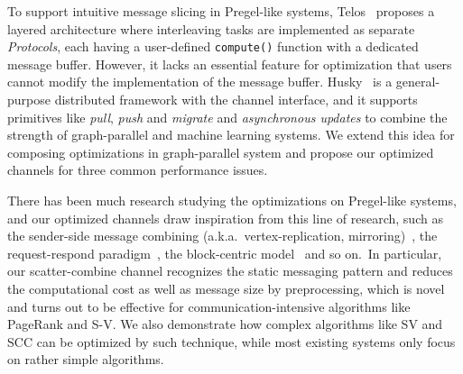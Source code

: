 \documentclass{sokendai_thesis} %
\begin{document}
To support intuitive message slicing in Pregel-like systems, Telos~\cite{telos} proposes a layered architecture where interleaving tasks are implemented as separate \emph{Protocols}, each having a user-defined \texttt{compute()} function with a dedicated message buffer.
However, it lacks an essential feature for optimization that users cannot modify the implementation of the message buffer.
Husky~\cite{husky} is a general-purpose distributed framework with the channel interface, and it supports primitives like \textit{pull}, \textit{push} and \textit{migrate} and \textit{asynchronous updates} to combine the strength of graph-parallel and machine learning systems.
We extend this idea for composing optimizations in graph-parallel system and propose our optimized channels for three common performance issues.

There has been much research studying the optimizations on Pregel-like systems, and our optimized channels draw inspiration from this line of research, such as the sender-side message combining (a.k.a.~vertex-replication, mirroring)~\cite{xpregel,gps,distrgraphlab,yan2015effective}, the request-respond paradigm~\cite{yan2015effective}, the block-centric model~\cite{thinkgraph,yan2014blogel,goffish} and so on.\
In particular, our scatter-combine channel recognizes the static messaging pattern and reduces the computational cost as well as message size by preprocessing, which is novel and turns out to be effective for com\-mu\-ni\-ca\-tion-intensive algorithms like PageRank and S-V.
We also demonstrate how complex algorithms like SV and SCC can be optimized by such technique, while most existing systems only focus on rather simple algorithms.
\end{document}
